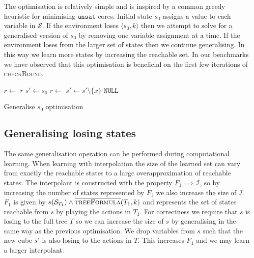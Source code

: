 The optimisation is relatively simple and is inspired by a common greedy
heuristic for minimising $\texttt{unsat}$ cores. Initial state $s_0$ assigns a value to
each variable in $\mathcal{S}$. If the environment loses $\langle s_0, k
\rangle$ then we attempt to solve for a generalised version of $s_0$ by removing
one variable assignment at a time. If the environment loses from the larger set of
states then we continue generalising. In this way we learn more
states by increasing the reachable set. In our benchmarks we have observed that
this optimisation is beneficial on the first few iterations of
\textsc{checkBound}.

\begin{algorithm}
    \begin{algorithmic}
            \State $r \gets $ 
             \Return $r$ \EndIIf
            \State $s' \gets s_0$
            \State $r \gets$  
                    \State $s' \gets s' \setminus \{x\}$ 
                \EndIf 
            \EndFor
            \State \Return $\texttt{NULL}$
        \EndFunction
    \end{algorithmic}
    \caption{Generalise $s_0$ optimisation}
    \label{alg:opt1}
\end{algorithm}

\subsection{Generalising losing states}

The same generalisation operation can be performed during computational learning. When learning with interpolation the size of the learned set can vary from exactly the reachable states to a large overapproximation of reachable states. The interpolant is constructed with the property $F_1 \implies \mathcal{I}$, so by increasing the number of states represented by $F_1$ we also increase the size of $\mathcal{I}$. $F_1$ is given by $s(\mathcal{S}_{T_1}) \land \textsc{$\overline{\mbox{treeFormula}}$}(T_1, k)$ and represents the set of states reachable from $s$ by playing the actions in $T_1$. For correctness we require that $s$ is losing to the full tree $T$ so we can increase the size of $s$ by generalising in the same way as the previous optimisation. We drop variables from $s$ such that the new cube $s'$ is also losing to the actions in $T$. This increases $F_1$ and we may learn a larger interpolant.

